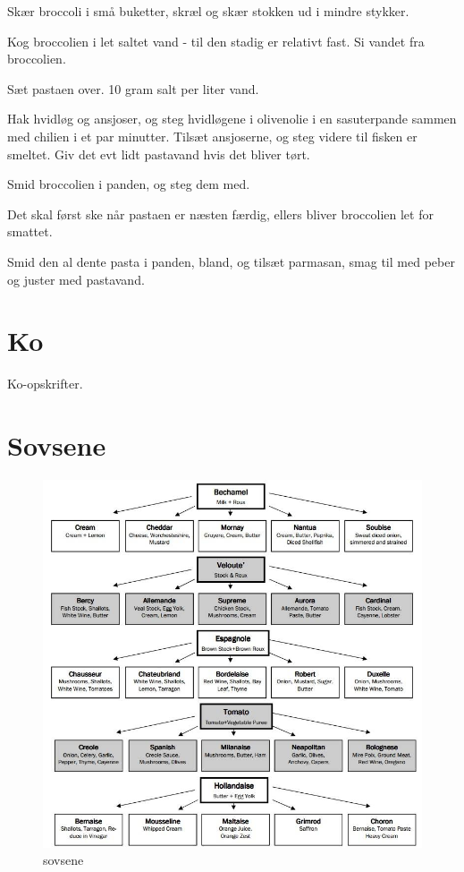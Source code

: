 \documentclass[
]{book}
\begin{document}
Skær broccoli i små buketter, skræl og skær stokken ud i mindre stykker.

Kog broccolien i let saltet vand - til den stadig er relativt fast. Si vandet fra broccolien.

Sæt pastaen over. 10 gram salt per liter vand.

Hak hvidløg og ansjoser, og steg hvidløgene i olivenolie i en sasuterpande sammen med chilien i et par minutter. Tilsæt ansjoserne, og steg videre til fisken er smeltet. Giv det evt lidt pastavand hvis det bliver tørt.

Smid broccolien i panden, og steg dem med.

Det skal først ske når pastaen er næsten færdig, ellers bliver broccolien let for smattet.

Smid den al dente pasta i panden, bland, og tilsæt parmasan, smag til med peber og juster med pastavand.

\hypertarget{ko}{%
\chapter{Ko}\label{ko}}

Ko-opskrifter.

\hypertarget{sovsene}{%
\chapter{Sovsene}\label{sovsene}}

\begin{figure}
\centering
\includegraphics{images/saucer.jpg}
\caption{sovsene}
\end{figure}
\end{document}
